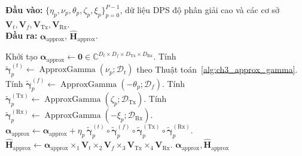 \begin{algorithm}[H]
\caption{Phương pháp DPS xấp xỉ bốn chiều}
\label{alg:ch3_approx_4d}
\textbf{Đầu vào:} \(\{\eta_p,\nu_p,\theta_p,\zeta_p,\xi_p\}_{p=0}^{P-1}\), dữ liệu DPS độ phân giải cao và các cơ sở \(\mathbf{V}_t,\mathbf{V}_f,\mathbf{V}_{\mathrm{Tx}},\mathbf{V}_{\mathrm{Rx}}\).\\
\textbf{Đầu ra:} \(\boldsymbol{\alpha}_{\mathrm{approx}}\), \(\widehat{\mathbf{H}}_{\mathrm{approx}}\).
\begin{algorithmic}[1]
\State Khởi tạo \(\boldsymbol{\alpha}_{\mathrm{approx}}\gets\mathbf{0}\in
\mathbb{C}^{D_t\times D_f\times D_{\mathrm{Tx}}\times D_{\mathrm{Rx}}}\).
    \State Tính \(\widetilde{\boldsymbol{\gamma}}^{(t)}_p\gets\operatorname{ApproxGamma}(\nu_p;\mathcal{D}_t)\) theo Thuật toán~\ref{alg:ch3_approx_gamma}.
    \State Tính \(\widetilde{\boldsymbol{\gamma}}^{(f)}_p\gets\operatorname{ApproxGamma}(-\theta_p;\mathcal{D}_f)\).
    \State Tính \(\widetilde{\boldsymbol{\gamma}}^{(\mathrm{Tx})}_p\gets\operatorname{ApproxGamma}(\zeta_p;\mathcal{D}_{\mathrm{Tx}})\).
    \State Tính \(\widetilde{\boldsymbol{\gamma}}^{(\mathrm{Rx})}_p\gets\operatorname{ApproxGamma}(-\xi_p;\mathcal{D}_{\mathrm{Rx}})\).
    \State \(\boldsymbol{\alpha}_{\mathrm{approx}}\gets\boldsymbol{\alpha}_{\mathrm{approx}}+\eta_p\,
    \widetilde{\boldsymbol{\gamma}}^{(t)}_p
    \circ\widetilde{\boldsymbol{\gamma}}^{(f)}_p
    \circ\widetilde{\boldsymbol{\gamma}}^{(\mathrm{Tx})}_p
    \circ\widetilde{\boldsymbol{\gamma}}^{(\mathrm{Rx})}_p\).
\EndFor
\State \(\widehat{\mathbf{H}}_{\mathrm{approx}}\gets
\boldsymbol{\alpha}_{\mathrm{approx}}
\times_1\mathbf{V}_t
\times_2\mathbf{V}_f
\times_3\mathbf{V}_{\mathrm{Tx}}
\times_4\mathbf{V}_{\mathrm{Rx}}\).
\State \Return \(\boldsymbol{\alpha}_{\mathrm{approx}},\widehat{\mathbf{H}}_{\mathrm{approx}}\)
\end{algorithmic}
\end{algorithm}

